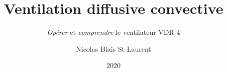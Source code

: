 \documentclass[letterpaper, final]{memoir}
\title{Ventilation diffusive convective}
\author{Nicolas Blais St-Laurent}
\subtitle{\emph{Opérer} et \emph{comprendre} le ventilateur VDR-4}
\date{2020}
\begin{document}
\frontmatter
\makeNtitle

\mainmatter

%




\end{document}
